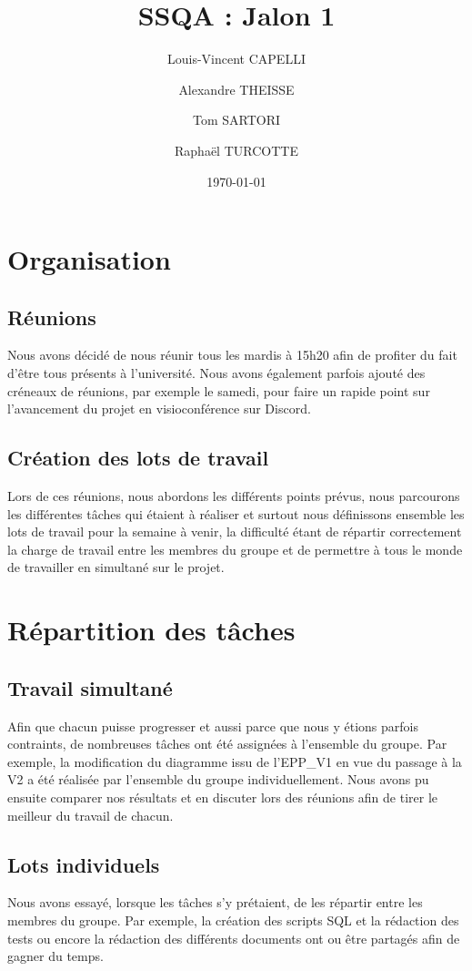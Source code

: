 \documentclass{report}
\begin{document}
\title{SSQA : Jalon 1}

\author{Louis-Vincent CAPELLI \and Alexandre THEISSE \and Tom SARTORI \and Raphaël TURCOTTE}
\date{\today}
\maketitle

\chapter{Organisation}
\section{Réunions}
Nous avons décidé de nous réunir tous les mardis à 15h20 
afin de profiter du fait d'être tous présents à l'université. 
Nous avons également parfois ajouté des créneaux de réunions,
par exemple le samedi, pour faire un rapide point sur l'avancement
du projet en visioconférence sur Discord.

\section{Création des lots de travail}
Lors de ces réunions, nous abordons les différents points prévus,
nous parcourons les différentes tâches qui étaient à réaliser
et surtout nous définissons ensemble les lots de travail
pour la semaine à venir, la difficulté étant de répartir correctement
la charge de travail entre les membres du groupe et de permettre à
tous le monde de travailler en simultané sur le projet.

\chapter{Répartition des tâches}
\section{Travail simultané}
Afin que chacun puisse progresser et aussi parce que nous y étions
parfois contraints, de nombreuses tâches ont été assignées à
l'ensemble du groupe. Par exemple, la modification du diagramme
issu de l'EPP\_V1 en vue du passage à la V2 a été réalisée par
l'ensemble du groupe individuellement. Nous avons pu ensuite 
comparer nos résultats et en discuter lors des réunions afin
de tirer le meilleur du travail de chacun.

\section{Lots individuels}
Nous avons essayé, lorsque les tâches s'y prétaient, de les
répartir entre les membres du groupe. Par exemple, la création
des scripts SQL et la rédaction des tests ou encore la rédaction
des différents documents ont ou être partagés afin de gagner
du temps.
\end{document}
